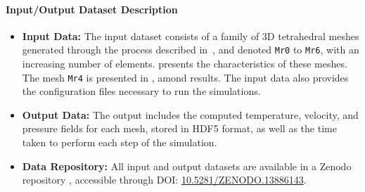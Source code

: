\paragraph{Input/Output Dataset Description}

\begin{itemize}
    \item \textbf{Input Data:} The input dataset consists of a family of 3D tetrahedral meshes generated through the process described in~\cite{chabannes_3d_2024}, and denoted \texttt{Mr0} to \texttt{Mr6}, with an increasing number of elements.
     presents the characteristics of these meshes.
    The mesh \texttt{Mr4} is presented in , amond results.
    The input data also provides the configuration files necessary to run the simulations.
    \item \textbf{Output Data:} The output includes the computed temperature, velocity, and pressure fields for each mesh, stored in HDF5 format, as well as the time taken to perform each step of the simulation.
    \item \textbf{Data Repository:} All input and output datasets are available in a Zenodo repository \cite{saigre_mesh_2024}, accessible through DOI: \href{https://doi.org/10.5281/ZENODO.13886143}{10.5281/ZENODO.13886143}.
\end{itemize}


